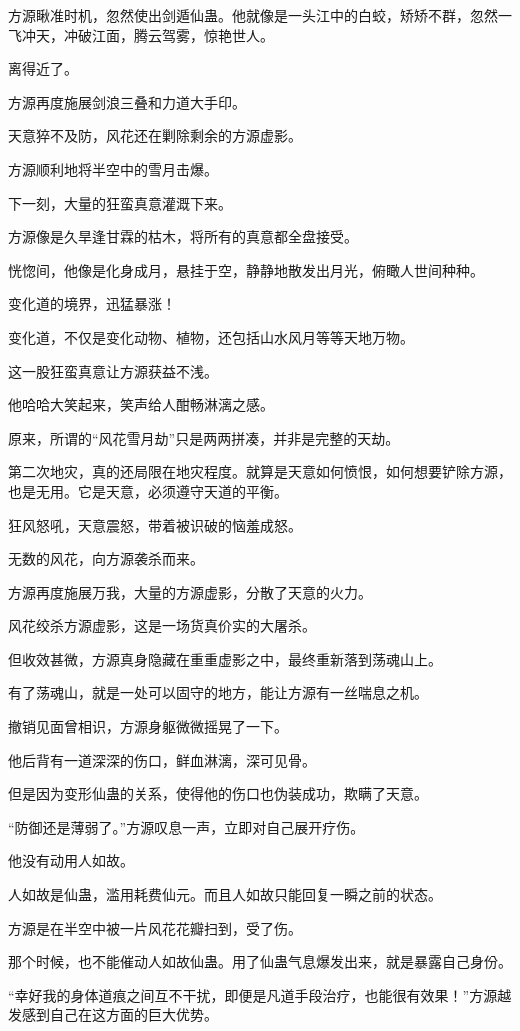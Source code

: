 \begin{this_body}
方源瞅准时机，忽然使出剑遁仙蛊。他就像是一头江中的白蛟，矫矫不群，忽然一飞冲天，冲破江面，腾云驾雾，惊艳世人。

离得近了。

方源再度施展剑浪三叠和力道大手印。

天意猝不及防，风花还在剿除剩余的方源虚影。

方源顺利地将半空中的雪月击爆。

下一刻，大量的狂蛮真意灌溉下来。

方源像是久旱逢甘霖的枯木，将所有的真意都全盘接受。

恍惚间，他像是化身成月，悬挂于空，静静地散发出月光，俯瞰人世间种种。

变化道的境界，迅猛暴涨！

变化道，不仅是变化动物、植物，还包括山水风月等等天地万物。

这一股狂蛮真意让方源获益不浅。

他哈哈大笑起来，笑声给人酣畅淋漓之感。

原来，所谓的“风花雪月劫”只是两两拼凑，并非是完整的天劫。

第二次地灾，真的还局限在地灾程度。就算是天意如何愤恨，如何想要铲除方源，也是无用。它是天意，必须遵守天道的平衡。

狂风怒吼，天意震怒，带着被识破的恼羞成怒。

无数的风花，向方源袭杀而来。

方源再度施展万我，大量的方源虚影，分散了天意的火力。

风花绞杀方源虚影，这是一场货真价实的大屠杀。

但收效甚微，方源真身隐藏在重重虚影之中，最终重新落到荡魂山上。

有了荡魂山，就是一处可以固守的地方，能让方源有一丝喘息之机。

撤销见面曾相识，方源身躯微微摇晃了一下。

他后背有一道深深的伤口，鲜血淋漓，深可见骨。

但是因为变形仙蛊的关系，使得他的伤口也伪装成功，欺瞒了天意。

“防御还是薄弱了。”方源叹息一声，立即对自己展开疗伤。

他没有动用人如故。

人如故是仙蛊，滥用耗费仙元。而且人如故只能回复一瞬之前的状态。

方源是在半空中被一片风花花瓣扫到，受了伤。

那个时候，也不能催动人如故仙蛊。用了仙蛊气息爆发出来，就是暴露自己身份。

“幸好我的身体道痕之间互不干扰，即便是凡道手段治疗，也能很有效果！”方源越发感到自己在这方面的巨大优势。


\end{this_body}
